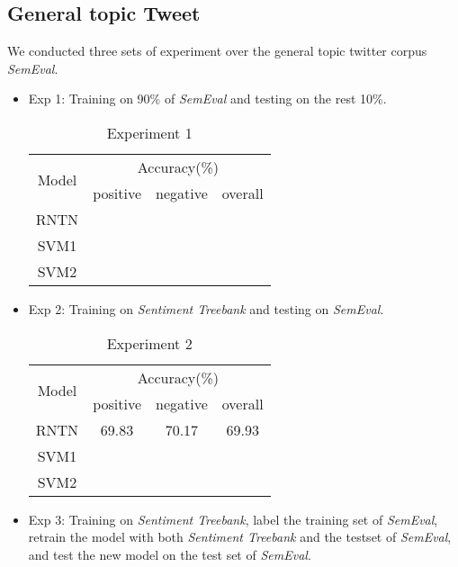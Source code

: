 \subsection{General topic Tweet}
We conducted three sets of experiment over the general topic twitter corpus \textit{SemEval}. 
\begin{itemize}
\item Exp 1: Training on 90\% of \textit{SemEval} and testing on the rest 10\%. 
\begin{table}[H]
  \begin{center}
    \begin{tabular}{cccc}\hline
      \multirow{2}{*}{Model} 
      & \multicolumn{3}{c}{Accuracy(\%)} \\\cline{2-4}
    & positive & negative & overall \\ \hline
    RNTN  &          &    	    &       \\ 
    SVM1  & ~        &          &         \\ 
    SVM2  & ~        &          &         \\ \hline
    \end{tabular}
    \end{center}
    \caption{\label{exp5_1} Experiment 1}
\end{table}

\item Exp 2: Training on \textit{Sentiment Treebank} and testing on \textit{SemEval}.  

\begin{table}[H]
  \begin{center}
    \begin{tabular}{cccc}\hline
      \multirow{2}{*}{Model} 
      & \multicolumn{3}{c}{Accuracy(\%)} \\\cline{2-4}
    & positive & negative & overall \\ \hline
    RNTN  & 69.83     &   70.17	    &   69.93    \\ 
    SVM1  & ~        &          &         \\ 
    SVM2  & ~        &          &         \\ \hline
    \end{tabular}
    \end{center}
    \caption{\label{exp5_2} Experiment 2}
\end{table}


\item Exp 3: Training on \textit{Sentiment Treebank}, label the training set of \textit{SemEval}, retrain the model with both \textit{Sentiment Treebank} and the testset of \textit{SemEval}, and test the new model on the test set of \textit{SemEval}. 


\end{itemize}
